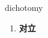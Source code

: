 
\begin{frame}
{\huge dichotomy}
\begin{center}
\begin{enumerate}\Large
  \item \textbf{对立}
\end{enumerate}
\end{center}
\end{frame}
